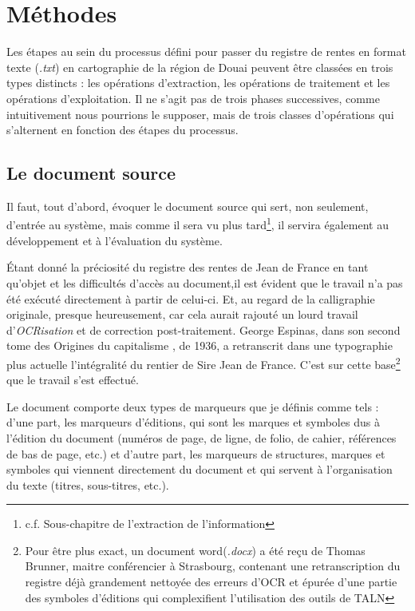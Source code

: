 \chapter{Méthodes}
Les étapes au sein du processus défini pour passer du registre de rentes en format texte (\textit{.txt}) en cartographie de la région de Douai peuvent être classées en trois types distincts : les opérations d’extraction, les opérations de traitement et les opérations d’exploitation. Il ne s’agit pas de trois phases successives, comme intuitivement nous pourrions le supposer, mais de trois classes d'opérations qui s’alternent en fonction des étapes du processus.

\section{Le document source}
Il faut, tout d'abord, évoquer le document source qui sert, non seulement, d'entrée au système, mais comme  il sera vu plus tard\footnote{c.f. Sous-chapitre de l'extraction de l'information}, il servira également au développement et à l'évaluation du système.

Étant donné la préciosité  du registre des rentes de Jean de France en tant qu'objet et les difficultés d'accès au document,il est évident que le travail n'a pas été exécuté directement à partir de celui-ci. Et, au regard de la calligraphie originale, presque heureusement, car cela aurait rajouté un lourd travail d'\textit{OCRisation} et de correction post-traitement. 
George Espinas, dans son second tome des \og Origines du capitalisme \fg , de 1936, a retranscrit dans une typographie plus actuelle l'intégralité du rentier de Sire Jean de France. C'est sur cette base\footnote{Pour être plus exact, un document word(\textit{.docx}) a été reçu de Thomas Brunner, maitre conférencier à Strasbourg, contenant une retranscription du registre déjà  grandement nettoyée des erreurs d'OCR et épurée d'une partie des symboles d'éditions qui complexifient l'utilisation des  outils de TALN} que le travail s'est effectué.

Le document comporte deux types de marqueurs que je définis comme tels : d'une part, les marqueurs d'éditions, qui sont les marques et symboles dus à l'édition du document (numéros de page, de ligne, de folio, de cahier, références de bas de page, etc.) et d'autre part, les marqueurs de structures, marques et symboles qui viennent directement du document et qui servent à l'organisation du texte (titres, sous-titres, etc.).

